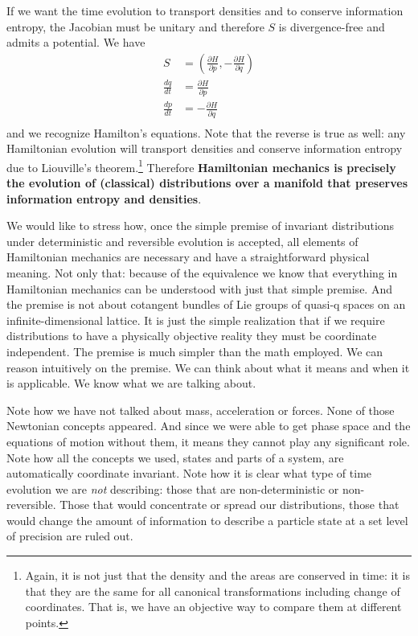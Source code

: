 \documentclass[11pt]{elsarticle}
\begin{document}
If we want the time evolution to transport  densities and to conserve information entropy, the Jacobian must be unitary and therefore $S$ is divergence-free and admits a potential. We have
\begin{equation}
\label{Potential_Hamilton}
\begin{aligned}
S &= \left(\frac{\partial H}{\partial p}, - \frac{\partial H}{\partial q}\right) \\
\frac{dq}{dt} &= \frac{\partial H}{\partial p}  \\
\frac{dp}{dt} &= - \frac{\partial H}{\partial q}  \\
\end{aligned}
\end{equation}
and we recognize Hamilton's equations. Note that the reverse is true as well: any Hamiltonian evolution will transport densities and conserve information entropy due to Liouville's theorem.\footnote{Again, it is not just that the density and the areas are conserved in time: it is that they are the same for all canonical transformations including change of coordinates. That is, we have an objective way to compare them at different points.} Therefore \textbf{Hamiltonian mechanics is precisely the evolution of (classical) distributions over a manifold that preserves information entropy and densities}.

We would like to stress how, once the simple premise of invariant distributions under deterministic and reversible evolution is accepted, all elements of Hamiltonian mechanics are necessary and have a straightforward physical meaning. Not only that: because of the equivalence we know that everything in Hamiltonian mechanics can be understood with just that simple premise. And the premise is not about cotangent bundles of Lie groups of quasi-q spaces on an infinite-dimensional lattice. It is just the simple realization that if we require distributions to have a physically objective reality they must be coordinate independent. The premise is much simpler than the math employed. We can reason intuitively on the premise. We can think about what it means and when it is applicable. We know what we are talking about.

Note how we have not talked about mass, acceleration or forces. None of those Newtonian concepts appeared. And since we were able to get phase space and the equations of motion without them, it means they cannot play any significant role. Note how all the concepts we used, states and parts of a system, are automatically coordinate invariant. Note how it is clear what type of time evolution we are \emph{not} describing: those that are non-deterministic or non-reversible. Those that would concentrate or spread our distributions, those that would change the amount of information to describe a particle state at a set level of precision are ruled out.
\end{document}
